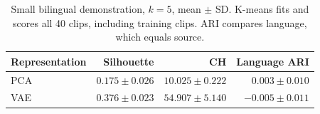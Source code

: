 \begin{table}[htbp]
\centering
\caption{Small bilingual demonstration, $k=5$, mean $\pm$ SD. K-means fits and scores all 40 clips, including training clips. ARI compares language, which equals source.}
\label{tab:bilingual}
\small
\begin{tabular}{lrrr}
\toprule
Representation & Silhouette & CH & Language ARI \\
\midrule
PCA & $0.175\pm0.026$ & $10.025\pm0.222$ & $0.003\pm0.010$ \\
VAE & $0.376\pm0.023$ & $54.907\pm5.140$ & $-0.005\pm0.011$ \\
\bottomrule
\end{tabular}
\end{table}
